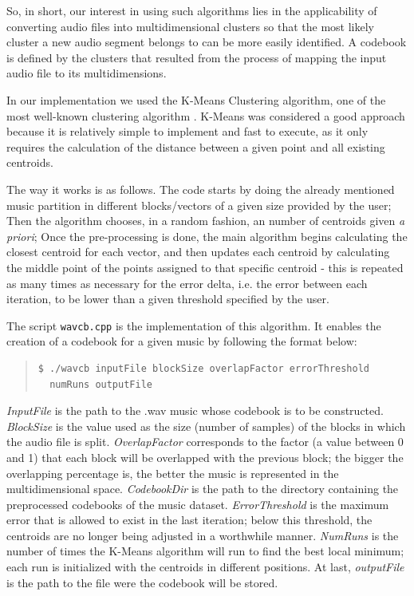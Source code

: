 \documentclass[12pt]{article}
\begin{document}
So, in short, our interest in using such algorithms lies in the applicability of 
converting audio files into multidimensional clusters so that the most likely
cluster a new audio segment belongs to can be more easily identified.
A codebook is defined by the clusters that resulted from the process of mapping
the input audio file to its multidimensions.

In our implementation we used the K-Means Clustering algorithm, one of the 
most well-known clustering algorithm \cite{clustering}. 
K-Means was considered a good approach because it is relatively simple to 
implement and fast to execute, as it only requires the calculation of the 
distance between a given point and all existing centroids. 

The way it works is as follows.
The code starts by doing the already mentioned music partition in different 
blocks/vectors of a given size provided by the user;
Then the algorithm chooses, in a random fashion, an number of centroids given 
{\it a priori\/};
Once the pre-processing is done, the main algorithm begins calculating the 
closest centroid for each vector, and then updates each centroid by calculating 
the middle point of the points assigned to that specific centroid - this is 
repeated as many times as necessary for the error delta, i.e. the error between 
each iteration, to be lower than a given threshold specified by the user. 

The script \texttt{wavcb.cpp} is the implementation of this algorithm.
It enables the creation of a codebook for a given music by following the format 
below:

\begingroup
\addtolength\leftmargini{-0.4in}
\begin{quote}
\begin{verbatim}
$ ./wavcb inputFile blockSize overlapFactor errorThreshold
  numRuns outputFile
\end{verbatim}
\end{quote}
\endgroup

{\it InputFile\/} is the path to the .wav music whose codebook is to be constructed.
{\it BlockSize\/} is the value used as the size (number of samples) of the blocks 
in which the audio file is split.
{\it OverlapFactor\/} corresponds to the factor (a value between 0 and 1) that 
each block will be overlapped with the previous block; the bigger the overlapping
percentage is, the better the music is represented in the multidimensional space.
{\it CodebookDir\/} is the path to the directory containing the 
preprocessed codebooks of the music dataset.
{\it ErrorThreshold\/} is the maximum error that is allowed to exist in the last 
iteration; below this threshold, the centroids are no longer being adjusted in a 
worthwhile manner.
{\it NumRuns\/} is the number of times the K-Means algorithm will run to find 
the best local minimum; each run is initialized with the centroids in different 
positions.
At last, {\it outputFile\/} is the path to the file were the codebook will be stored. \\
\end{document}
